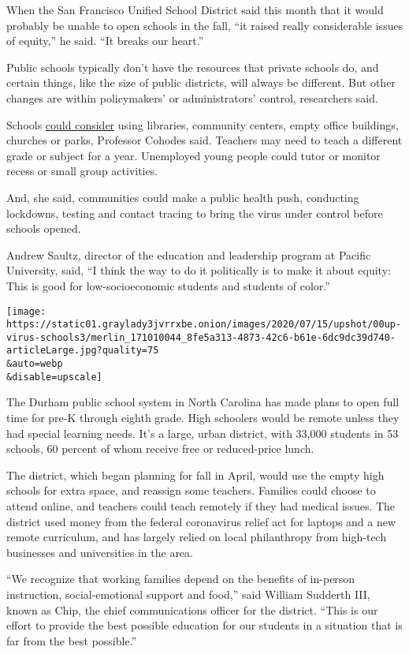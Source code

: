 When the San Francisco Unified School District said this month that it
would probably be unable to open schools in the fall, ``it raised really
considerable issues of equity,'' he said. ``It breaks our heart.''

Public schools typically don't have the resources that private schools
do, and certain things, like the size of public districts, will always
be different. But other changes are within policymakers' or
administrators' control, researchers said.

Schools
\href{https://www.theatlantic.com/ideas/archive/2020/07/better-fall-possible/613882/}{could
consider} using libraries, community centers, empty office buildings,
churches or parks, Professor Cohodes said. Teachers may need to teach a
different grade or subject for a year. Unemployed young people could
tutor or monitor recess or small group activities.

And, she said, communities could make a public health push, conducting
lockdowns, testing and contact tracing to bring the virus under control
before schools opened.

Andrew Saultz, director of the education and leadership program at
Pacific University, said, ``I think the way to do it politically is to
make it about equity: This is good for low-socioeconomic students and
students of color.''

\texttt{[image: https://static01.graylady3jvrrxbe.onion/images/2020/07/15/upshot/00up-virus-schools3/merlin\_171010044\_8fe5a313-4873-42c6-b61e-6dc9dc39d740-articleLarge.jpg?quality=75\\\&auto=webp\\\&disable=upscale]}

The Durham public school system in North Carolina has made plans to open
full time for pre-K through eighth grade. High schoolers would be remote
unless they had special learning needs. It's a large, urban district,
with 33,000 students in 53 schools, 60 percent of whom receive free or
reduced-price lunch.

The district, which began planning for fall in April, would use the
empty high schools for extra space, and reassign some teachers. Families
could choose to attend online, and teachers could teach remotely if they
had medical issues. The district used money from the federal coronavirus
relief act for laptops and a new remote curriculum, and has largely
relied on local philanthropy from high-tech businesses and universities
in the area.

``We recognize that working families depend on the benefits of in-person
instruction, social-emotional support and food,'' said William Sudderth
III, known as Chip, the chief communications officer for the district.
``This is our effort to provide the best possible education for our
students in a situation that is far from the best possible.''

